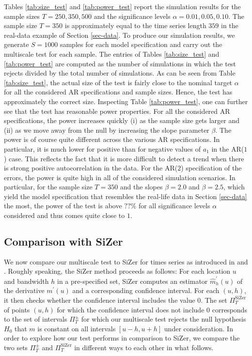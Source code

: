 Tables \ref{tab:size_test} and \ref{tab:power_test} report the simulation results for the sample sizes $T=250,350,500$ and the significance levels $\alpha = 0.01, 0.05, 0.10$. The sample size $T = 350$ is approximately equal to the time series length $359$ in the real-data example of Section \ref{sec-data}. To produce our simulation results, we generate $S=1000$ samples for each model specification and carry out the multiscale test for each sample. The entries of Tables \ref{tab:size_test} and \ref{tab:power_test} are computed as the number of simulations in which the test rejects divided by the total number of simulations. As can be seen from Table \ref{tab:size_test}, the actual size of the test is fairly close to the nominal target $\alpha$ for all the considered AR specifications and sample sizes. Hence, the test has approximately the correct size. Inspecting Table \ref{tab:power_test}, one can further see that the test has reasonable power properties. For all the considered AR specifications, the power increases quickly (i) as the sample size gets larger and (ii) as we move away from the null by increasing the slope parameter $\beta$. The power is of course quite different across the various AR specifications. In particular, it is much lower for positive than for negative values of $a_1$ in the AR($1$) case. This reflects the fact that it is more difficult to detect a trend when there is strong positive autocorrelation in the data. For the AR($2$) specification of the errors, the power is quite high in all of the considered simulation scenarios. In particular, for the sample size $T=350$ and the slopes $\beta = 2.0$ and $\beta = 2.5$, which yield the model specification that resembles the real-life data in Section \ref{sec-data} the most, the power of the test is above $??\%$ for all significance levels $\alpha$ considered and thus comes quite close to $1$.


\subsection{Comparison with SiZer}\label{subsec-sim-2}


We now compare our multiscale test to SiZer for times series as introduced in \cite{Rondonotti2004} and \cite{Rondonotti2007}. Roughly speaking, the SiZer method proceeds as follows: For each location $u$ and bandwidth $h$ in a pre-specified set, SiZer computes an estimator $\widehat{m}_h^\prime(u)$ of the derivative $m^\prime(u)$ and a corresponding confidence interval. For each $(u,h)$, it then checks whether the confidence interval includes the value $0$. The set $\Pi_T^{\text{SiZer}}$ of points $(u,h)$ for which the confidence interval does not include $0$ corresponds to the set of intervals $\Pi_T^\pm$ for which our multiscale test rejects the null hypothesis $H_0$ that $m$ is constant on all intervals $[u-h,u+h]$ under consideration. %
In order to explore how our test performs in comparison to SiZer, we compare the two sets $\Pi_T^\pm$ and $\Pi_T^{\text{SiZer}}$ in different ways to each other in what follows. 


